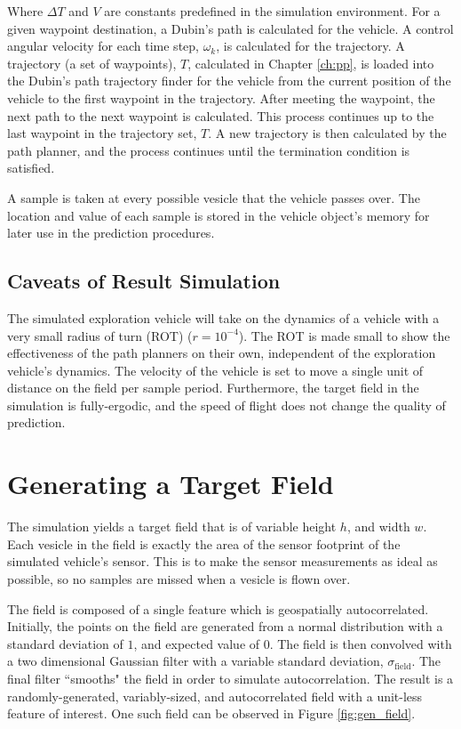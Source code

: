 Where $\Delta T$ and $V$ are constants predefined in the simulation environment. For a given waypoint destination, a Dubin's path is calculated for the vehicle. A control angular velocity for each time step, $\omega_k$, is calculated for the trajectory. A trajectory (a set of waypoints), $T$, calculated in Chapter \ref{ch:pp}, is loaded into the Dubin's path trajectory finder for the vehicle from the current position of the vehicle to the first waypoint in the trajectory. After meeting the waypoint, the next path to the next waypoint is calculated. This process continues up to the last waypoint in the trajectory set, $T$. A new trajectory is then calculated by the path planner, and the process continues until the termination condition is satisfied.

A sample is taken at every possible vesicle that the vehicle passes over. The location and value of each sample is stored in the vehicle object's memory for later use in the prediction procedures.

\subsection{Caveats of Result Simulation}
The simulated exploration vehicle will take on the dynamics of a vehicle with a very small radius of turn (ROT) ($r = 10^{-4}$). The ROT is made small to show the effectiveness of the path planners on their own, independent of the exploration vehicle's dynamics. The velocity of the vehicle is set to move a single unit of distance on the field per sample period. Furthermore, the target field in the simulation is fully-ergodic, and the speed of flight does not change the quality of prediction.

\section{Generating a Target Field}
The simulation yields a target field that is of variable height $h$, and width $w$. Each vesicle in the field is exactly the area of the sensor footprint of the simulated vehicle's sensor. This is to make the sensor measurements as ideal as possible, so no samples are missed when a vesicle is flown over.

The field is composed of a single feature which is geospatially autocorrelated. Initially, the points on the field are generated from a normal distribution with a standard deviation of $1$, and expected value of $0$. The field is then convolved with a two dimensional Gaussian filter with a variable standard deviation, $\sigma_{\text{field}}$. The final filter ``smooths" the field in order to simulate autocorrelation. The result is a randomly-generated, variably-sized, and autocorrelated field with a unit-less feature of interest. One such field can be observed in Figure \ref{fig:gen_field}.
